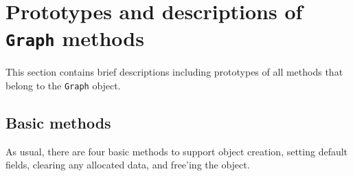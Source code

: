 \par
\section{Prototypes and descriptions of {\tt Graph} methods}
\label{section:Graph:proto}
\par
This section contains brief descriptions including prototypes
of all methods that belong to the {\tt Graph} object.
\par
\subsection{Basic methods}
\label{subsection:Graph:proto:basics}
\par
As usual, there are four basic methods to support object creation,
setting default fields, clearing any allocated data, and free'ing
the object.
\par

